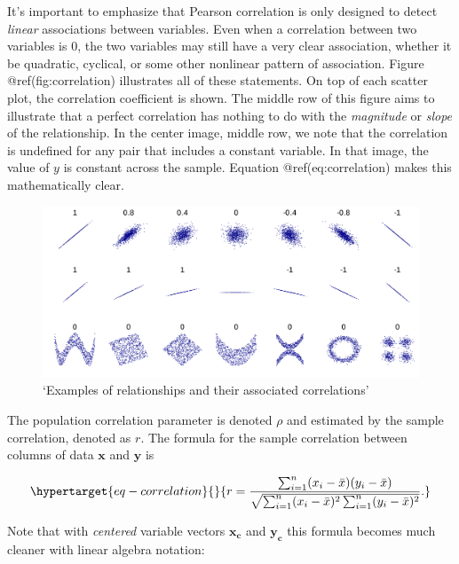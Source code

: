 \documentclass[
  letterpaper,
  DIV=11,
  numbers=noendperiod]{scrreprt}
\begin{document}
It's important to emphasize that Pearson correlation is only designed to
detect \emph{linear} associations between variables. Even when a
correlation between two variables is 0, the two variables may still have
a very clear association, whether it be quadratic, cyclical, or some
other nonlinear pattern of association. Figure @ref(fig:correlation)
illustrates all of these statements. On top of each scatter plot, the
correlation coefficient is shown. The middle row of this figure aims to
illustrate that a perfect correlation has nothing to do with the
\emph{magnitude} or \emph{slope} of the relationship. In the center
image, middle row, we note that the correlation is undefined for any
pair that includes a constant variable. In that image, the value of
\(y\) is constant across the sample. Equation @ref(eq:correlation) makes
this mathematically clear.

\begin{figure}

{\centering \includegraphics{./img/correlation.png}

}

\caption{\label{fig-correlation}`Examples of relationships and their
associated correlations'}

\end{figure}

The population correlation parameter is denoted \(\rho\) and estimated
by the sample correlation, denoted as \(r\). The formula for the sample
correlation between columns of data \(\mathbf{x}\) and \(\mathbf{y}\) is

\begin{equation}\protect\hypertarget{eq-correlation}{}{
r = \frac{\sum_{i=1}^n (x_i-\bar{x})(y_i-\bar{x})}{\sqrt{\sum_{i=1}^n (x_i-\bar{x})^2\sum_{i=1}^n(y_i-\bar{x})^2}}.
}\label{eq-correlation}\end{equation}

Note that with \emph{centered} variable vectors \(\mathbf{x_c}\) and
\(\mathbf{y_c}\) this formula becomes much cleaner with linear algebra
notation:
\end{document}
